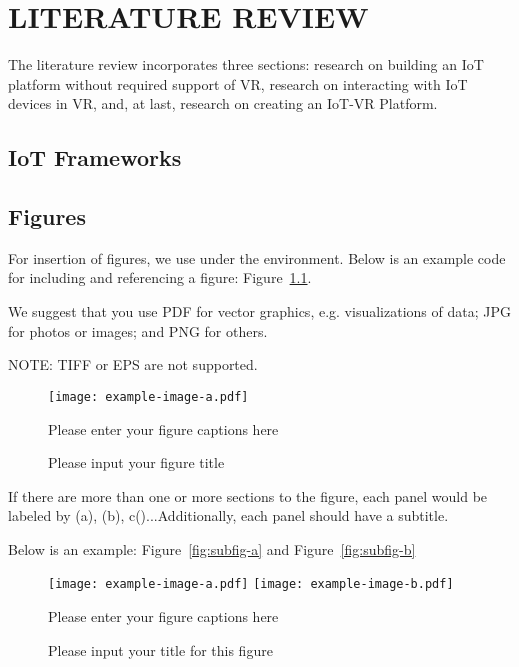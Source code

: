 
\chapter{LITERATURE REVIEW}


The literature review incorporates three sections: research on building an IoT platform without required support of VR, research on interacting with IoT devices in VR, and, at last, research on creating an IoT-VR Platform.

\section{IoT Frameworks}


\section{Figures}

For insertion of figures, we use  under the  environment. Below is an example code for including and referencing a figure: Figure~\ref{fig:example}.

We suggest that you use PDF for vector graphics, e.g. visualizations of data; JPG for photos or images; and PNG for others.

NOTE: TIFF or EPS are not supported.

\begin{figure}
  \centering
  \texttt{[image: example-image-a.pdf]}
  \caption{Please input your figure title}
  {Please enter your figure captions here}
  \label{fig:example}
\end{figure}

If there are more than one or more sections to the figure, each panel would be labeled by (a), (b), c()...Additionally, each panel should have a subtitle.

Below is an example: Figure~\ref{fig:subfig-a} and Figure~\ref{fig:subfig-b}


\begin{figure}
  \centering
    {\texttt{[image: example-image-a.pdf]}}
    {\texttt{[image: example-image-b.pdf]}}
  \caption{Please input your title for this figure}
  {Please enter your figure captions here}
  \label{fig:multi-image}
\end{figure}



